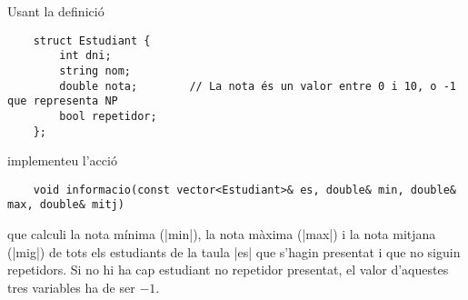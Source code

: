 
\Statement

Usant la definició 

\begin{lstlisting}
    struct Estudiant {
        int dni;
        string nom;
        double nota;        // La nota és un valor entre 0 i 10, o -1 que representa NP
        bool repetidor;
    };
\end{lstlisting}

implementeu l'acció

\begin{lstlisting}
    void informacio(const vector<Estudiant>& es, double& min, double& max, double& mitj)
\end{lstlisting}

que calculi la nota mínima (|min|), la nota màxima (|max|) i la nota
mitjana (|mig|) de tots els estudiants de la taula |es| que s'hagin
presentat i que no siguin
repetidors. Si no hi ha cap estudiant no repetidor presentat, el valor
d'aquestes tres variables ha de ser $-1$.

\ObservationNoMainTuples
